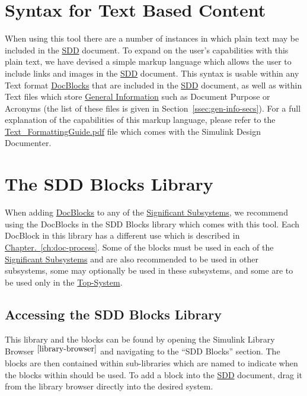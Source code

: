 \documentclass{mcscert}
\newcommand{\simulink}{Simulink}
\newcommand{\sddtool}{Simulink Design Documenter}
\newcommand{\sddblks}{SDD Blocks Library}
\newcommand{\topsystemnolink}{Top-System} %
\newcommand{\topsystem}{\hyperref[def:topsystem]{\topsystemnolink{}}}
\newcommand{\sigsubsnolink}{Significant Subsystems} %
\newcommand{\sigsubs}{\hyperref[def:sigsubs]{\sigsubsnolink{}}}
\newcommand{\geninfonolink}{General Information}
\newcommand{\geninfo}{\hyperref[def:general-info]{\geninfonolink{}}}
\newcommand{\docblockslink}{\hyperref[def:docblock]{\textsf{DocBlocks}}}
\begin{document}
\section{Syntax for Text Based Content}
\label{sec:textsyntax}
When using this tool there are a number of instances in which plain text may be included in the \hyperref[acr:sdd]{SDD} document. 
To expand on the user's capabilities with this plain text, we have devised a simple markup language which allows the user to include links and images in the \hyperref[acr:sdd]{SDD} document. 
This syntax is usable within any Text format \docblockslink{} that are included in the \hyperref[acr:sdd]{SDD} document, as well as within Text files which store \geninfo{} such as Document Purpose or Acronyms (the list of these files is given in Section~\hyperref[ssec:gen-info-secs]{\ref*{ssec:gen-info-secs}}). 
For a full explanation of the capabilities of this markup language, please refer to the \href{run:Text_FormattingGuide.pdf}{Text\_FormattingGuide.pdf} file which comes with the \sddtool{}.

\section{The \sddblks{}}
\label{ssec:SDD-Blocks-Lib}
When adding \docblockslink{} to any of the \sigsubs{}, we recommend using the \textsf{DocBlocks} in the SDD Blocks library which comes with this tool. 
Each \textsf{DocBlock} in this library has a different use which is described in \hyperref[ch:doc-process]{Chapter.~\ref*{ch:doc-process}}. 
Some of the blocks must be used in each of the \sigsubs{} and are also recommended to be used in other subsystems, some may optionally be used in these subsystems, and some are to be used only in the \topsystem{}. 
      
	\subsection{Accessing the \sddblks{}}
	This library and the blocks can be found by opening the \simulink{} Library Browser $^{\ref{library-browser}}$ and navigating to the ``SDD Blocks'' section. 
	The blocks are then contained within sub-libraries which are named to indicate when the blocks within should be used. 
	To add a block into the \hyperref[acr:sdd]{SDD} document, drag it from the library browser directly into the desired system.
      
\end{document}
